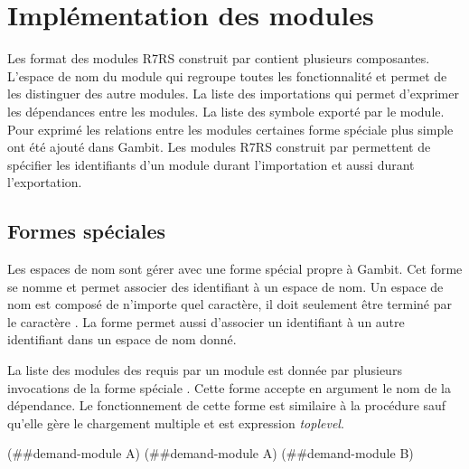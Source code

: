 
\chapter{Implémentation des modules}

Les format des modules R7RS construit par  contient
plusieurs composantes. L'espace de nom du module qui regroupe toutes les
fonctionnalité et permet de les distinguer des autre modules.  La liste des
importations qui permet d'exprimer les dépendances entre les modules. La liste
des symbole exporté par le module. Pour exprimé les relations entre les modules
certaines forme spéciale plus simple ont été ajouté dans Gambit.  Les modules
R7RS construit par  permettent de spécifier les
identifiants d'un module durant l'importation et aussi durant l'exportation.




\section{Formes spéciales}

Les espaces de nom sont gérer avec une forme spécial propre à Gambit. Cet forme
se nomme  et permet associer des identifiant à un espace
de nom.  Un espace de nom est composé de n'importe quel caractère, il doit
seulement être terminé par le caractère \lstcode{#}.  La forme
 permet aussi d'associer un identifiant à un autre
identifiant dans un espace de nom donné.


La liste des modules des requis par un module est donnée par plusieurs
invocations de la forme spéciale . Cette forme
accepte en argument le nom de la dépendance. Le fonctionnement de cette
forme est similaire à la procédure  sauf qu'elle gère le
chargement multiple et est expression \textit{toplevel}.
\begin{center}
  \begin{mplisting}{0.9}
(##demand-module A)
(##demand-module A)
(##demand-module B)
\end{mplisting}
\end{center}

